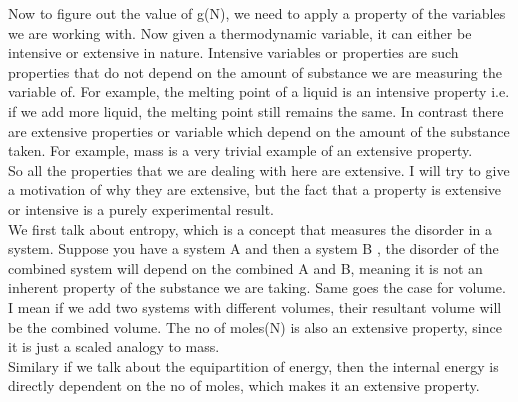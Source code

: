     Now to figure out the value of g(N), we need to apply a property of the variables we are working
    with. Now given a thermodynamic variable, it can either be intensive or extensive in nature.
    Intensive variables or properties are such properties that do not depend on the amount of substance
    we are measuring the variable of. For example, the melting point of a liquid is an intensive property
    i.e. if we add more liquid, the melting point still remains the same. In contrast there are 
    extensive properties or variable which depend on the amount of the substance taken. For example,
    mass is a very trivial example of an extensive property. \\ 
    So all the properties that we are dealing with here are extensive. I will try to give a motivation 
    of why they are extensive, but the fact that a property is extensive or intensive is a purely 
    experimental result. \\ 

    We first talk about entropy, which is a concept that measures the disorder in a system. Suppose
    you have a system A and then a system B , the disorder of the combined system will depend on the 
    combined A and B, meaning it is not an inherent property of the substance we are taking. Same goes 
    the case for volume. I mean if we add two systems with different volumes, their resultant volume 
    will be the combined volume. The no of moles(N) is also an extensive property, since it is just a 
    scaled analogy to mass. \\ 
    Similary if we talk about the equipartition of energy, then the internal energy is directly dependent
    on the no of moles, which makes it an extensive property. \\ 

